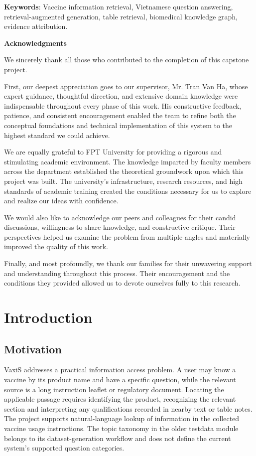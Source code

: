 \documentclass[sn-mathphys, oneside]{sn-jnl}
\begin{document}
\textbf{Keywords}: Vaccine information retrieval, Vietnamese question answering, retrieval-augmented generation, table retrieval, biomedical knowledge graph, evidence attribution.

\newpage
\begin{center}
    \bfseries\Large Acknowledgments
\end{center}

We sincerely thank all those who contributed to the completion of this capstone project.

First, our deepest appreciation goes to our supervisor, Mr. Tran Van Ha, whose expert guidance, thoughtful direction, and extensive domain knowledge were indispensable throughout every phase of this work. His constructive feedback, patience, and consistent encouragement enabled the team to refine both the conceptual foundations and technical implementation of this system to the highest standard we could achieve.

We are equally grateful to FPT University for providing a rigorous and stimulating academic environment. The knowledge imparted by faculty members across the department established the theoretical groundwork upon which this project was built. The university's infrastructure, research resources, and high standards of academic training created the conditions necessary for us to explore and realize our ideas with confidence.

We would also like to acknowledge our peers and colleagues for their candid discussions, willingness to share knowledge, and constructive critique. Their perspectives helped us examine the problem from multiple angles and materially improved the quality of this work.

Finally, and most profoundly, we thank our families for their unwavering support and understanding throughout this process. Their encouragement and the conditions they provided allowed us to devote ourselves fully to this research.
\newpage
\tableofcontents
\newpage
\listoffigures
\newpage
\section{Introduction}

\subsection{Motivation}
VaxiS addresses a practical information access problem. A user may know a vaccine by its product name and have a specific question, while the relevant source is a long instruction leaflet or regulatory document. Locating the applicable passage requires identifying the product, recognizing the relevant section and interpreting any qualifications recorded in nearby text or table notes. The project supports natural-language lookup of information in the collected vaccine usage instructions. The topic taxonomy in the older testdata module belongs to its dataset-generation workflow and does not define the current system's supported question categories.
\end{document}
